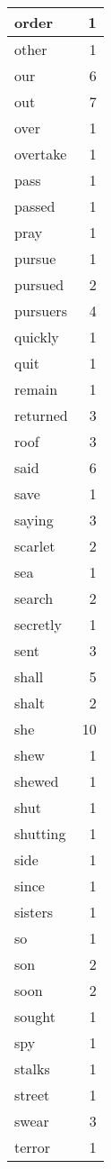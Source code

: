\begin{center}
\begin{longtable}{l|r}
order & 1 \\ \hline
other & 1 \\ \hline
our & 6 \\ \hline
out & 7 \\ \hline
over & 1 \\ \hline
overtake & 1 \\ \hline
pass & 1 \\ \hline
passed & 1 \\ \hline
pray & 1 \\ \hline
pursue & 1 \\ \hline
pursued & 2 \\ \hline
pursuers & 4 \\ \hline
quickly & 1 \\ \hline
quit & 1 \\ \hline
remain & 1 \\ \hline
returned & 3 \\ \hline
roof & 3 \\ \hline
said & 6 \\ \hline
save & 1 \\ \hline
saying & 3 \\ \hline
scarlet & 2 \\ \hline
sea & 1 \\ \hline
search & 2 \\ \hline
secretly & 1 \\ \hline
sent & 3 \\ \hline
shall & 5 \\ \hline
shalt & 2 \\ \hline
she & 10 \\ \hline
shew & 1 \\ \hline
shewed & 1 \\ \hline
shut & 1 \\ \hline
shutting & 1 \\ \hline
side & 1 \\ \hline
since & 1 \\ \hline
sisters & 1 \\ \hline
so & 1 \\ \hline
son & 2 \\ \hline
soon & 2 \\ \hline
sought & 1 \\ \hline
spy & 1 \\ \hline
stalks & 1 \\ \hline
street & 1 \\ \hline
swear & 3 \\ \hline
terror & 1 \\ \hline

\end{longtable}
\end{center}
